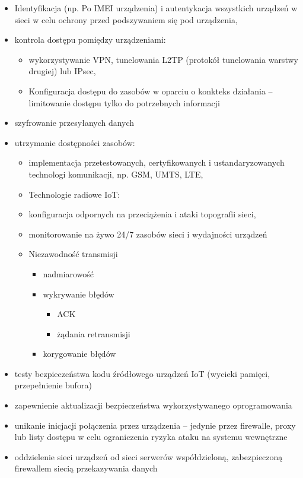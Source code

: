 \begin{itemize}
	\item Identyfikacja (np. Po IMEI urządzenia) i autentykacja wszystkich urządzeń w sieci w celu ochrony przed podszywaniem się pod urządzenia,
	\item kontrola dostępu pomiędzy urządzeniami:
	\begin{itemize}
		\item wykorzystywanie VPN, tunelowania L2TP (protokół tunelowania warstwy drugiej) lub IPsec,
		\item Konfiguracja dostępu do zasobów w oparciu o konkteks działania – limitowanie dostępu tylko do potrzebnych informacji
	\end{itemize}
	\item szyfrowanie przesyłanych danych
	\item utrzymanie dostępności zasobów:
	\begin{itemize}
		\item implementacja przetestowanych, certyfikowanych i  ustandaryzowanych technologi komunikacji, np. GSM, UMTS, LTE, 
		\item Technologie radiowe IoT:
		\item konfiguracja odpornych na przeciążenia i ataki topografii sieci, 
		\item monitorowanie na żywo 24/7 zasobów sieci i wydajności urządzeń
		\item Niezawodność transmisji
		\begin{itemize}
			\item nadmiarowość
			\item wykrywanie błędów
			\begin{itemize}
				\item ACK
				\item żądania retransmisji
			\end{itemize}
			\item korygowanie błędów
		\end{itemize}
	\end{itemize}
	\item testy bezpieczeństwa kodu źródłowego urządzeń IoT (wycieki pamięci, przepełnienie bufora)
	\item zapewnienie aktualizacji bezpieczeństwa wykorzystywanego oprogramowania
	\item unikanie inicjacji połączenia przez urządzenia – jedynie przez firewalle, proxy lub listy dostępu w celu ograniczenia ryzyka ataku na systemu wewnętrzne
	\item oddzielenie sieci urządzeń od sieci serwerów współdzieloną, zabezpieczoną firewallem siecią przekazywania danych
\end{itemize}

